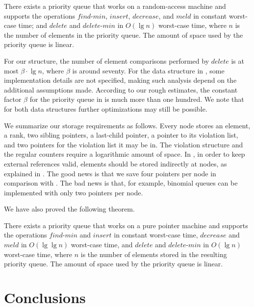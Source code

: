 \documentclass{llncs}
\newcommand{\Findmin}{\mbox{$\mathit{find}$\mbox{\rm -}$\mathit{min}$}}
\newcommand{\Insert}{\mbox{$\mathit{insert}$}}
\newcommand{\Deletemin}{\mbox{$\mathit{delete}$\mbox{\rm -}$\mathit{min}$}}
\newcommand{\Decrease}{\mbox{$\mathit{decrease}$}}
\newcommand{\Delete}{\mbox{$\mathit{delete}$}}
\newcommand{\Meld}{\mbox{$\mathit{meld}$}}
\begin{document}
\begin{theorem}
There exists a priority queue that works on a random-access machine
and supports the operations \Findmin{},
\Insert{}, \Decrease{}, and \Meld{} in constant worst-case time; and
\Delete{} and \Deletemin{} in $O(\lg n)$ worst-case time, where $n$ is
the number of elements in the priority queue.  The amount of space used by the
priority queue is linear.
\end{theorem}

For our structure, the number of element comparisons performed by
\Delete{} is at most $\beta \cdot \lg n$, where $\beta$ is around
seventy. For the data structure in \cite{Bro96}, some
implementation details are not specified, making such analysis depend on
the additional assumptions made.  According to our rough estimates,
the constant factor $\beta$ for the priority queue in \cite{Bro96} is much more than
one hundred. We note that for both data structures further
optimizations may still be possible.

We summarize our storage requirements as follows. Every node stores an
element, a rank, two sibling pointers, a last-child pointer, a pointer
to its violation list, and two pointers for the violation list it may
be in. The violation structure and the regular counters require a logarithmic
amount of space.  In \cite{Bro96}, in order to keep external
references valid, elements should be stored indirectly at nodes, as
explained in \cite[Chapter 6]{CLRS09}.  The good news is that we save
four pointers per node in comparison with \cite{Bro96}. The bad news
is that, for example, binomial queues \cite{Vui78} can be implemented
with only two pointers per node.

We have also proved the following theorem.

\begin{theorem}
There exists a priority queue that works on a pure pointer machine and
supports the operations \Findmin{} and \Insert{} in constant
worst-case time, \Decrease{} and \Meld{} in $O(\lg\lg n)$ worst-case
time, and \Delete{} and \Deletemin{} in $O(\lg n)$ worst-case time,
where $n$ is the number of elements stored in the resulting priority
queue.  The amount of space used by the priority queue is linear.
\end{theorem}


\section{Conclusions}
\end{document}
